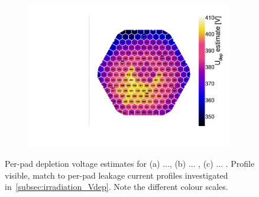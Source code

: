 \begin{figure}
\begin{subfigure}[b]{0.32\textwidth}
		\includegraphics[width=0.99\textwidth]{plots/Vdep_hexplots/1002.pdf}
		\subcaption{
		}
		\label{plot:Vdep_hexplot_1002}
	\end{subfigure}	
	\caption{
		Per-pad depletion voltage estimates for (a) ..., (b)  ... , (c) ... .
		Profile visible, match to per-pad leakage current profiles investigated in~\ref{subsec:irradiation_Vdep}.
		Note the different colour scales.
	}
\end{figure}